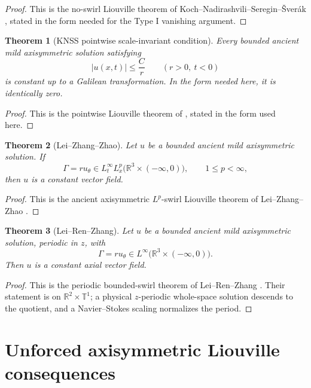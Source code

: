 \documentclass[11pt]{amsart}
\theoremstyle{plain}
\newtheorem{theorem}{Theorem}[section]
\theoremstyle{definition}
\theoremstyle{remark}
\numberwithin{equation}{section}
\begin{document}
\begin{proof}
This is the no-swirl Liouville theorem of
Koch--Nadirashvili--Seregin--\v{S}ver\'ak \cite{KNSS2009}, stated in the form
needed for the Type I vanishing argument.
\end{proof}

\begin{theorem}[KNSS pointwise scale-invariant condition]
\label{p3:thm:knss-pointwise}
Every bounded ancient mild axisymmetric solution satisfying
\[
   |u(x,t)|\le \frac{C}{r}
   \qquad(r>0,\ t<0)
\]
is constant up to a Galilean transformation.  In the form needed here, it is
identically zero.
\end{theorem}

\begin{proof}
This is the pointwise Liouville theorem of \cite{KNSS2009}, stated in the form
used here.
\end{proof}

\begin{theorem}[Lei--Zhang--Zhao]
\label{p3:thm:lzz}
Let \(u\) be a bounded ancient mild axisymmetric solution.  If
\[
   \Gamma=ru_\theta\in L_t^\infty L_x^p
   \bigl(\mathbb R^3\times(-\infty,0)\bigr),
   \qquad 1\le p<\infty,
\]
then \(u\) is a constant vector field.
\end{theorem}

\begin{proof}
This is the ancient axisymmetric \(L^p\)-swirl Liouville theorem of
Lei--Zhang--Zhao \cite{LZZ}.
\end{proof}

\begin{theorem}[Lei--Ren--Zhang]
\label{p3:thm:lrz}
Let \(u\) be a bounded ancient mild axisymmetric solution, periodic in \(z\),
with
\[
   \Gamma=ru_\theta\in L^\infty
   \bigl(\mathbb R^3\times(-\infty,0)\bigr).
\]
Then \(u\) is a constant axial vector field.
\end{theorem}

\begin{proof}
This is the periodic bounded-swirl theorem of Lei--Ren--Zhang
\cite{LRZ}.  Their statement is on \(\mathbb R^2\times\mathbb T^1\); a
physical \(z\)-periodic whole-space solution descends to the quotient, and a
Navier--Stokes scaling normalizes the period.
\end{proof}

\section{Unforced axisymmetric Liouville consequences}
\label{p3:sec:axisymmetric-consequences}
\end{document}
